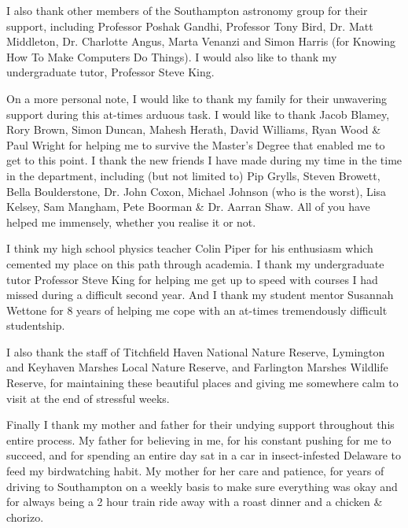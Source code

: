 \par I also thank other members of the Southampton astronomy group for their support, including Professor Poshak Gandhi, Professor Tony Bird, Dr. Matt Middleton, Dr. Charlotte Angus, Marta Venanzi and Simon Harris (for Knowing How To Make Computers Do Things).  I would also like to thank my undergraduate tutor, Professor Steve King.
\par On a more personal note, I would like to thank my family for their unwavering support during this at-times arduous task.  I would like to thank Jacob Blamey, Rory Brown, Simon Duncan, Mahesh Herath, David Williams, Ryan Wood \& Paul Wright for helping me to survive the Master's Degree that enabled me to get to this point.  I thank the new friends I have made during my time in the time in the department, including (but not limited to) Pip Grylls, Steven Browett, Bella Boulderstone, Dr. John Coxon, Michael Johnson (who is the worst), Lisa Kelsey, Sam Mangham, Pete Boorman \& Dr. Aarran Shaw.  All of you have helped me immensely, whether you realise it or not.
\par I think my high school physics teacher Colin Piper for his enthusiasm which cemented my place on this path through academia.  I thank my undergraduate tutor Professor Steve King for helping me get up to speed with courses I had missed during a difficult second year.  And I thank my student mentor Susannah Wettone for 8 years of helping me cope with an at-times tremendously difficult studentship.
\par I also thank the staff of Titchfield Haven National Nature Reserve, Lymington and Keyhaven Marshes Local Nature Reserve, and Farlington Marshes Wildlife Reserve, for maintaining these beautiful places and giving me somewhere calm to visit at the end of stressful weeks.
\par Finally I thank my mother and father for their undying support throughout this entire process.  My father for believing in me, for his constant pushing for me to succeed, and for spending an entire day sat in a car in insect-infested Delaware to feed my birdwatching habit.  My mother for her care and patience, for years of driving to Southampton on a weekly basis to make sure everything was okay and for always being a 2 hour train ride away with a roast dinner and a chicken \& chorizo.